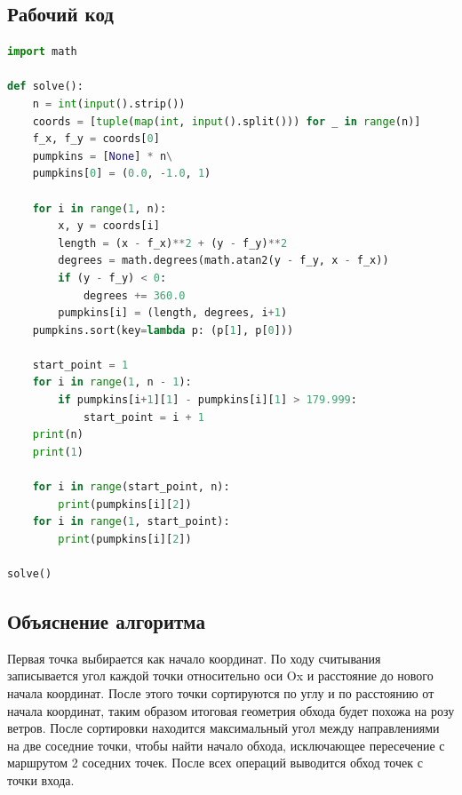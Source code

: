 \documentclass[a4paper,12pt]{article}
\begin{document}
\subsection*{Рабочий код}
\begin{lstlisting}[language=python]
import math

def solve():
    n = int(input().strip())
    coords = [tuple(map(int, input().split())) for _ in range(n)]
    f_x, f_y = coords[0]
    pumpkins = [None] * n\
    pumpkins[0] = (0.0, -1.0, 1)

    for i in range(1, n):
        x, y = coords[i]
        length = (x - f_x)**2 + (y - f_y)**2
        degrees = math.degrees(math.atan2(y - f_y, x - f_x))
        if (y - f_y) < 0:
            degrees += 360.0
        pumpkins[i] = (length, degrees, i+1)
    pumpkins.sort(key=lambda p: (p[1], p[0]))

    start_point = 1
    for i in range(1, n - 1):
        if pumpkins[i+1][1] - pumpkins[i][1] > 179.999:
            start_point = i + 1
    print(n)
    print(1)

    for i in range(start_point, n):
        print(pumpkins[i][2])
    for i in range(1, start_point):
        print(pumpkins[i][2])

solve()

\end{lstlisting}
\subsection*{Объяснение алгоритма}
Первая точка выбирается как начало координат. По ходу считывания записывается угол каждой точки относительно оси Ox и расстояние до нового начала координат. После этого точки сортируются по углу и по расстоянию от начала координат, таким образом итоговая геометрия обхода будет похожа на розу ветров. После сортировки находится максимальный угол между направлениями на две соседние точки, чтобы найти начало обхода, исключающее пересечение с маршрутом 2 соседних точек. После всех операций выводится обход точек с точки входа.
\newpage
\end{document}
